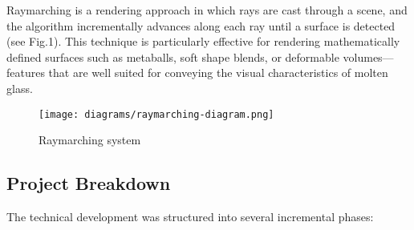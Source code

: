 \documentclass{rapportcs}
\begin{document}
        Raymarching is a rendering approach in which rays are cast through a scene, and the algorithm incrementally advances along each ray until a surface is detected (see Fig.1). This technique is particularly effective for rendering mathematically defined surfaces such as metaballs, soft shape blends, or deformable volumes—features that are well suited for conveying the visual characteristics of molten glass.
    
        \begin{figure}[H]
            \centering
            \texttt{[image: diagrams/raymarching-diagram.png]}
            \caption{Raymarching system}
            \label{fig:label_image}
        \end{figure}
    
    \newpage
    
    \subsection{Project Breakdown}
        
        The technical development was structured into several incremental phases:
\end{document}
